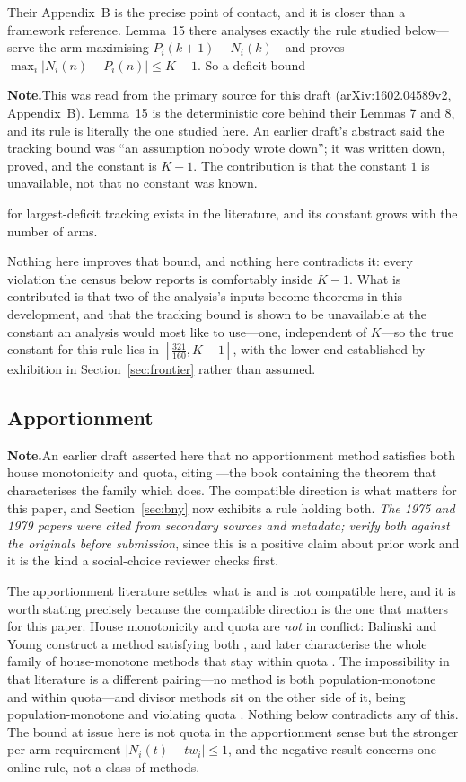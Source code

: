 \documentclass[conference]{IEEEtran}
\theoremstyle{definition}
\newif\ifshownotes\shownotestrue
\newcommand{\NOTEPAR}[1]{\ifshownotes\par\vspace{2pt}\noindent%
  {\color{notecol}\textsf{\footnotesize\textbf{Note.}\;#1}}\par\vspace{2pt}\fi}
\begin{document}
Their Appendix~B is the precise point of contact, and it is closer than a framework
reference. Lemma~15 there analyses exactly the rule studied below---serve the arm maximising
$P_{i}(k{+}1)-N_{i}(k)$---and proves $\max_{i}|N_{i}(n)-P_{i}(n)|\le K-1$. So a deficit bound
\NOTEPAR{This was read from the primary source for this draft (arXiv:1602.04589v2,
Appendix~B). Lemma~15 is the deterministic core behind their Lemmas 7 and 8, and its rule is
literally the one studied here. An earlier draft's abstract said the tracking bound was ``an
assumption nobody wrote down''; it was written down, proved, and the constant is $K-1$. The
contribution is that the constant $1$ is unavailable, not that no constant was known.}
for largest-deficit tracking exists in the literature, and its constant grows with the number
of arms.

Nothing here improves that bound, and nothing here contradicts it: every violation the census
below reports is comfortably inside $K-1$. What is contributed is that two of the analysis's
inputs become theorems in this development, and that the tracking bound is shown to be
unavailable at the constant an analysis would most like to use---one, independent of $K$---so
the true constant for this rule lies in $[\tfrac{321}{160},K-1]$, with the lower end
established by exhibition in Section~\ref{sec:frontier} rather than assumed.

\subsection{Apportionment}
\NOTEPAR{An earlier draft asserted here that no apportionment method satisfies both
house monotonicity and quota, citing \cite{balinski1982}---the book containing the theorem
that characterises the family which does. The compatible direction is what matters for this
paper, and Section~\ref{sec:bny} now exhibits a rule holding both. \emph{The 1975 and 1979
papers were cited from secondary sources and metadata; verify both against the originals
before submission}, since this is a positive claim about prior work and it is the kind a
social-choice reviewer checks first.}

The apportionment literature settles what is and is not compatible here, and it is worth
stating precisely because the compatible direction is the one that matters for this paper.
House monotonicity and quota are \emph{not} in conflict: Balinski and Young construct a
method satisfying both \cite{balinski1975}, and later characterise the whole family of
house-monotone methods that stay within quota \cite{balinski1979}. The impossibility in that
literature is a different pairing---no method is both population-monotone and within
quota---and divisor methods sit on the other side of it, being population-monotone and
violating quota \cite{balinski1982}. Nothing below contradicts any of this. The bound at
issue here is not quota in the apportionment sense but the stronger per-arm requirement
$|N_{i}(t)-t w_{i}|\le 1$, and the negative result concerns one online rule, not a class of
methods.
\end{document}
